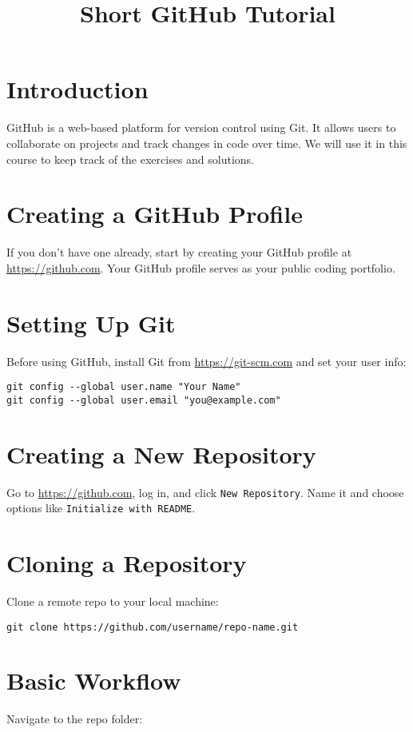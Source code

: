 \documentclass[11pt]{article}
\title{Short GitHub Tutorial}
\author{}
\date{}
\begin{document}
\maketitle

\section{Introduction}
GitHub is a web-based platform for version control using Git. It allows users to collaborate on projects and track changes in code over time. We will use it in this course to keep track of the exercises and solutions.

\section{Creating a GitHub Profile}
If you don't have one already, start by creating your GitHub profile at \url{https://github.com}. Your GitHub profile serves as your public coding portfolio.

\section{Setting Up Git}
Before using GitHub, install Git from \url{https://git-scm.com} and set your user info:

\begin{lstlisting}
git config --global user.name "Your Name"
git config --global user.email "you@example.com"
\end{lstlisting}

\section{Creating a New Repository}
Go to \url{https://github.com}, log in, and click \texttt{New Repository}. Name it and choose options like \texttt{Initialize with README}.

\section{Cloning a Repository}
Clone a remote repo to your local machine:

\begin{lstlisting}
git clone https://github.com/username/repo-name.git
\end{lstlisting}

\section{Basic Workflow}
Navigate to the repo folder:
\end{document}
